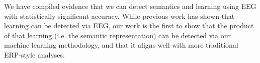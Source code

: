 \label{chapter:discussion}

We have compiled evidence that we can detect semantics and learning using EEG 
with statistically significant accuracy. While previous work has shown that 
learning can be detected via EEG, our work is the first to show that the 
product of that learning (i.e. the semantic representation) can be detected via 
our machine learning methodology, and that it aligns well with more traditional 
ERP-style analyses.








